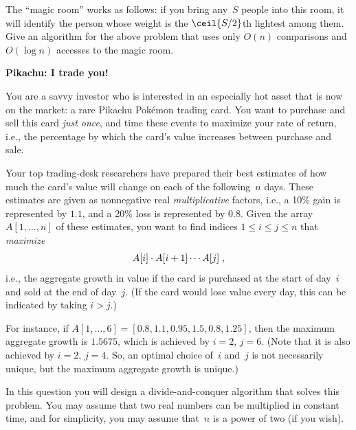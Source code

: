 \documentclass[11pt,addpoints]{exam}
\begin{document}
\begin{questions}
  The ``magic room'' works as follows: if you bring any~$S$ people into this room, it will identify the person whose weight is the $\ceil{S/2}$th lightest among them.
  Give an algorithm for the above problem that uses only $O(n)$ comparisons and $O(\log n)$ accesses to the magic room.

  \begin{solution}

  \end{solution}

  \question \textbf{Pikachu: I trade you!}
  
  You are a savvy investor who is interested in an especially hot asset that is now on the market: a rare Pikachu Pok{\'e}mon trading card.
  You want to purchase and sell this card \emph{just once}, and time these events to maximize your rate of return, i.e., the percentage by which the card's value increases between purchase and sale.

  Your top trading-desk researchers have prepared their best estimates of how much the card's value will change on each of the following~$n$ days.
  These estimates are given as nonnegative real \emph{multiplicative} factors, i.e., a 10\% gain is represented by $1.1$, and a 20\% loss is represented by $0.8$.
  Given the array $A[1,\ldots,n]$ of these estimates, you want to find indices $1 \leq i \leq j \leq n$ that \emph{maximize} \[ A[i] \cdot A[i+1] \cdots A[j] \; \text, \] i.e., the aggregate growth in value if the card is purchased at the start of day~$i$ and sold at the end of day~$j$.
  (If the card would lose value every day, this can be indicated by taking $i > j$.)
      
  For instance, if $A[1, \ldots, 6] = [0.8, 1.1, 0.95, 1.5, 0.8, 1.25]$, then the maximum aggregate growth is $1.5675$, which is achieved by $i=2$, $j=6$.
  (Note that it is also achieved by $i=2$, $j=4$.
  So, an optimal choice of~$i$ and~$j$ is not necessarily unique, but the maximum aggregate growth is unique.)
    
  In this question you will design a divide-and-conquer algorithm that solves this problem.
  You may assume that two real numbers can be multiplied in constant time, and for simplicity, you may assume that~$n$ is a power of two (if you wish).
  
\end{questions}
\end{document}
